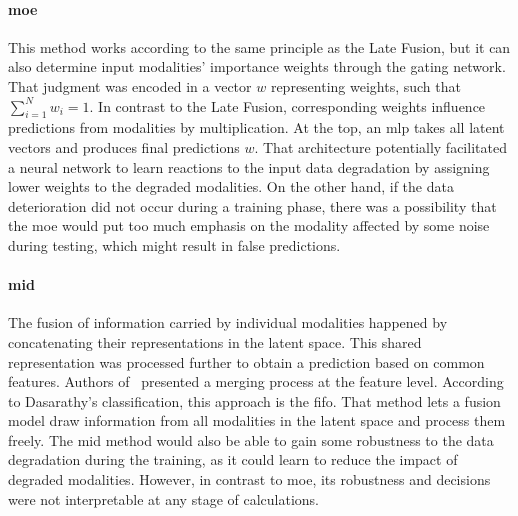 \documentclass[a4paper, 10pt, twoside]{report}
\begin{document}
\paragraph{\acrfull{moe}} This method works according to the same principle as the Late Fusion, but it can also determine input modalities' importance weights through the gating network. That judgment was encoded in a vector $w$ representing weights, such that $\sum_{i=1}^{N} w_i = 1$. In contrast to the Late Fusion, corresponding weights influence predictions from modalities by multiplication. At the top, an \acrshort{mlp} takes all latent vectors and produces final predictions $w$. That architecture potentially facilitated a neural network to learn reactions to the input data degradation by assigning lower weights to the degraded modalities. On the other hand, if the data deterioration did not occur during a training phase, there was a possibility that the \acrshort{moe} would put too much emphasis on the modality affected by some noise during testing, which might result in false predictions.

\paragraph{\acrfull{mid}} The fusion of information carried by individual modalities happened by concatenating their representations in the latent space. This shared representation was processed further to obtain a prediction based on common features. Authors of~\cite{Castanedo2013ARO} presented a merging process at the feature level. According to Dasarathy's classification, this approach is the \acrfull{fifo}. That method lets a fusion model draw information from all modalities in the latent space and process them freely. The \acrshort{mid} method would also be able to gain some robustness to the data degradation during the training, as it could learn to reduce the impact of degraded modalities. However, in contrast to \acrshort{moe}, its robustness and decisions were not interpretable at any stage of calculations.
\end{document}
